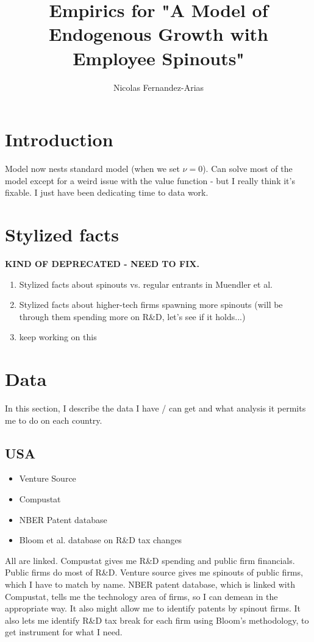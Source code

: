 \documentclass[12pt,english]{article}
\theoremstyle{remark}
\begin{document}
\title{Empirics for "A Model of Endogenous Growth with Employee Spinouts"}
\author{Nicolas Fernandez-Arias}
\maketitle

\section{Introduction}
Model now nests standard model (when we set $\nu = 0$). Can solve most of the model except for a weird issue with the value function - but I really think it's fixable. I just have been dedicating time to data work. 

\section{Stylized facts}
\textbf{KIND OF DEPRECATED - NEED TO FIX.}
\begin{enumerate}
	\item Stylized facts about spinouts vs. regular entrants in Muendler et al.
	\item Stylized facts about higher-tech firms spawning more spinouts (will be through them spending more on R\&D, let's see if it holds...)
	\item keep working on this
\end{enumerate}

\section{Data}
In this section, I describe the data I have / can get and what analysis it permits me to do on each country. 


\subsection{USA}
\begin{itemize}
	\item Venture Source
	\item Compustat
	\item NBER Patent database
	\item Bloom et al. database on R\&D tax changes
\end{itemize}



All are linked. Compustat gives me R\&D spending and public firm financials. Public firms do most of R\&D. Venture source gives me spinouts of public firms, which I have to match by name. NBER patent database, which is linked with Compustat, tells me the technology area of firms, so I can demean in the appropriate way. It also might allow me to identify patents by spinout firms. It also lets me identify R\&D tax break for each firm using Bloom's methodology, to get instrument for what I need. 
\end{document}
